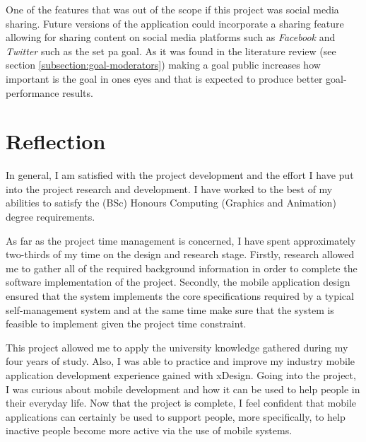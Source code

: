One of the features that was out of the scope if this project was social media sharing. Future versions of the application could incorporate a sharing feature allowing for sharing content on social media platforms such as \textit{Facebook} and \textit{Twitter} such as the set \gls{pa} goal. As it was found in the literature review (see section \ref{subsection:goal-moderators}) making a goal public increases how important is the goal in ones eyes and that is expected to produce better goal-performance results.

\section{Reflection}
In general, I am satisfied with the project development and the effort I have put into the project research and development. I have worked to the best of my abilities to satisfy the (BSc) Honours Computing (Graphics and Animation) degree requirements.

As far as the project time management is concerned, I have spent approximately two-thirds of my time on the design and research stage. Firstly, research allowed me to gather all of the required background information in order to complete the software implementation of the project. Secondly, the mobile application design ensured that the system implements the core specifications required by a typical self-management system and at the same time make sure that the system is feasible to implement given the project time constraint.

This project allowed me to apply the university knowledge gathered during my four years of study. Also, I was able to practice and improve my industry mobile application development experience gained with xDesign. Going into the project, I was curious about mobile development and how it can be used to help people in their everyday life. Now that the project is complete, I feel confident that mobile applications can certainly be used to support people, more specifically, to help inactive people become more active via the use of mobile systems.
